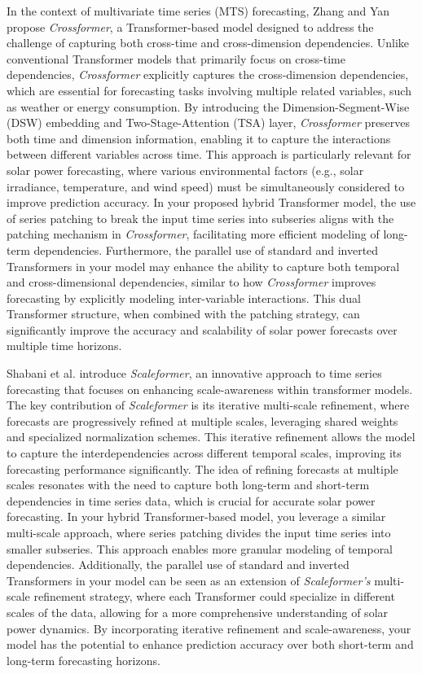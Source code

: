 \documentclass[12pt]{uomthesis}
\begin{document}
In the context of multivariate time series (MTS) forecasting, Zhang and Yan \cite{zhang2022crossformer} propose \textit{Crossformer}, a Transformer-based model designed to address the challenge of capturing both cross-time and cross-dimension dependencies. Unlike conventional Transformer models that primarily focus on cross-time dependencies, \textit{Crossformer} explicitly captures the cross-dimension dependencies, which are essential for forecasting tasks involving multiple related variables, such as weather or energy consumption. By introducing the Dimension-Segment-Wise (DSW) embedding and Two-Stage-Attention (TSA) layer, \textit{Crossformer} preserves both time and dimension information, enabling it to capture the interactions between different variables across time. This approach is particularly relevant for solar power forecasting, where various environmental factors (e.g., solar irradiance, temperature, and wind speed) must be simultaneously considered to improve prediction accuracy. In your proposed hybrid Transformer model, the use of series patching to break the input time series into subseries aligns with the patching mechanism in \textit{Crossformer}, facilitating more efficient modeling of long-term dependencies. Furthermore, the parallel use of standard and inverted Transformers in your model may enhance the ability to capture both temporal and cross-dimensional dependencies, similar to how \textit{Crossformer} improves forecasting by explicitly modeling inter-variable interactions. This dual Transformer structure, when combined with the patching strategy, can significantly improve the accuracy and scalability of solar power forecasts over multiple time horizons.

Shabani et al. \cite{shabani2022scaleformer} introduce \textit{Scaleformer}, an innovative approach to time series forecasting that focuses on enhancing scale-awareness within transformer models. The key contribution of \textit{Scaleformer} is its iterative multi-scale refinement, where forecasts are progressively refined at multiple scales, leveraging shared weights and specialized normalization schemes. This iterative refinement allows the model to capture the interdependencies across different temporal scales, improving its forecasting performance significantly. The idea of refining forecasts at multiple scales resonates with the need to capture both long-term and short-term dependencies in time series data, which is crucial for accurate solar power forecasting. In your hybrid Transformer-based model, you leverage a similar multi-scale approach, where series patching divides the input time series into smaller subseries. This approach enables more granular modeling of temporal dependencies. Additionally, the parallel use of standard and inverted Transformers in your model can be seen as an extension of \textit{Scaleformer's} multi-scale refinement strategy, where each Transformer could specialize in different scales of the data, allowing for a more comprehensive understanding of solar power dynamics. By incorporating iterative refinement and scale-awareness, your model has the potential to enhance prediction accuracy over both short-term and long-term forecasting horizons.
\end{document}
